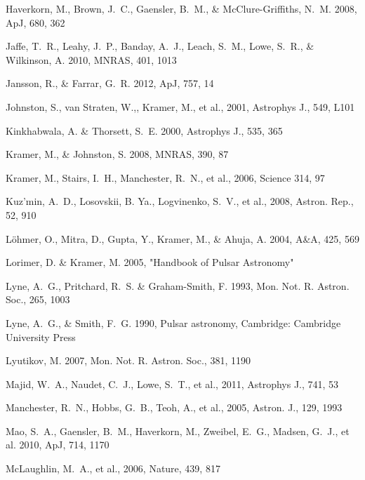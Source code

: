 \begin{thebibliography}{99}
\begin{multicols}{2}
{
Haverkorn, M., Brown, J.~C., Gaensler, B.~M., \& McClure-Griffiths, N.~M. 2008, ApJ, 680, 362

Jaffe, T.~R., Leahy, J.~P., Banday, A.~J., Leach, S.~M., Lowe, S.~R., \& Wilkinson, A. 2010, MNRAS, 401, 1013

Jansson, R., \& Farrar, G.~R. 2012, ApJ, 757, 14

Johnston, S., van Straten, W.,, Kramer, M., et al., 2001, Astrophys J., 549, L101

Kinkhabwala, A. \& Thorsett, S.~E. 2000, Astrophys J., 535, 365

Kramer, M., \& Johnston, S. 2008, MNRAS, 390, 87

Kramer, M., Stairs, I.~H., Manchester, R.~N., et al., 2006, Science 314, 97

Kuz'min, A.~D., Losovskii, B. Ya., Logvinenko, S.~V., et al., 2008, Astron. Rep., 52, 910

L\"{o}hmer, O., Mitra, D., Gupta, Y., Kramer, M., \& Ahuja, A. 2004, A\&A, 425, 569

Lorimer, D. \& Kramer, M. 2005, "Handbook of Pulsar Astronomy"

Lyne, A.~G., Pritchard, R.~S. \& Graham-Smith, F. 1993, Mon. Not. R. Astron. Soc., 265, 1003

Lyne, A.~G., \& Smith, F.~G. 1990, Pulsar astronomy, Cambridge: Cambridge University Press

Lyutikov, M. 2007, Mon. Not. R. Astron. Soc., 381, 1190

Majid, W.~A., Naudet, C.~J., Lowe, S.~T., et al., 2011, Astrophys J., 741, 53

Manchester, R.~N., Hobbs, G.~B., Teoh, A., et al., 2005, Astron. J., 129, 1993

Mao, S.~A., Gaensler, B.~M., Haverkorn, M., Zweibel, E.~G., Madsen, G.~J., et al. 2010, ApJ,  714, 1170

McLaughlin, M.~A., et al., 2006, Nature, 439, 817

}
\end{multicols}
\end{thebibliography}

